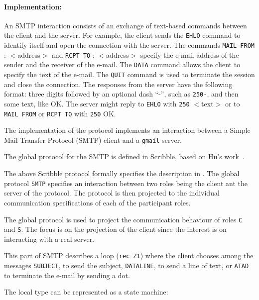 
\paragraph{Implementation:}
An SMTP interaction consists of an exchange of text-based {commands}
between the client and the server.
For example, the client sends the
\lstinline|EHLO| command to identify itself and open the connection with
the server.
%
The commands \lstinline|MAIL FROM| : $<$address$>$ and \lstinline|RCPT TO| : $<$address$>$
specify the e-mail address of the sender and the
receiver of the e-mail.
%
The \lstinline|DATA| command allows the client to specify the text of
the e-mail. The \lstinline|QUIT| command is used to terminate the
session and close the connection. The responses from the server have the
following format: three digits followed by an optional dash ``-'', such
as \lstinline|250-|, and then some text, like OK. The server might reply
to \lstinline|EHLO| with \lstinline|250| $<$text$>$ or to
\lstinline|MAIL FROM| or \lstinline|RCPT TO| with \lstinline|250| OK.


The implementation of the protocol implements an interaction between
a Simple Mail Transfer Protocol (SMTP) client and a \lstinline|gmail| server.


The global protocol for the SMTP is defined in Scribble, 
based on Hu's work~\cite{HuR:smtp}.



The above Scribble protocol formally specifies
the description in .
The global protocol \lstinline|SMTP| specifies
an interaction between two roles being the client ant the server of the protocol.
The protocol is then projected to the
individual communication specifications of each 
of the participant roles.

The global protocol is used to project the communication
behaviour of roles \lstinline|C| and \lstinline|S|.
The focus is on the projection of the client
since the interest is on interacting with a real server.

This part of SMTP describes a loop (\lstinline|rec Z1|) where the client chooses
among the messages \lstinline|SUBJECT|, to send the subject,
\lstinline|DATALINE|, to send a line of text, or \lstinline|ATAD| to terminate the e-mail by sending a dot.



The local type can be represented as a state
machine:


